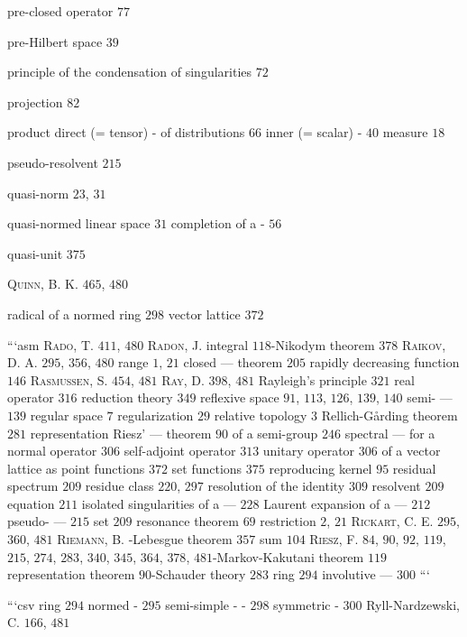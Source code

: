 pre-closed operator $77$

pre-Hilbert space $39$

principle of the condensation of singularities $72$

projection $82$

product direct (= tensor) - of distributions $66$ inner (= scalar) - $40$ measure $18$

pseudo-resolvent $215$

quasi-norm $23$, $31$

quasi-normed linear space $31$ completion of a - $56$

quasi-unit $375$

\textsc{Quinn}, B. K. $465$, $480$

radical of a normed ring $298$ vector lattice $372$ 

```asm \textsc{Rado}, T. $411$, $480$ \textsc{Radon}, J. integral $118$-Nikodym theorem $378$ \textsc{Raikov}, D. A. $295$, $356$, $480$ range $1$, $21$ closed --- theorem $205$ rapidly decreasing function $146$ \textsc{Rasmussen}, S. $454$, $481$ \textsc{Ray}, D. $398$, $481$ Rayleigh's principle $321$ real operator $316$ reduction theory $349$ reflexive space $91$, $113$, $126$, $139$, $140$ semi- --- $139$ regular space $7$ regularization $29$ relative topology $3$ Rellich-Gårding theorem $281$ representation Riesz' --- theorem $90$ of a semi-group $246$ spectral --- for a normal operator $306$ self-adjoint operator $313$ unitary operator $306$ of a vector lattice as point functions $372$ set functions $375$ reproducing kernel $95$ residual spectrum $209$ residue class $220$, $297$ resolution of the identity $309$ resolvent $209$ equation $211$ isolated singularities of a --- $228$ Laurent expansion of a --- $212$ pseudo- --- $215$ set $209$ resonance theorem $69$ restriction $2$, $21$ \textsc{Rickart}, C. E. $295$, $360$, $481$ \textsc{Riemann}, B. -Lebesgue theorem $357$ sum $104$ \textsc{Riesz}, F. $84$, $90$, $92$, $119$, $215$, $274$, $283$, $340$, $345$, $364$, $378$, $481$-Markov-Kakutani theorem $119$ representation theorem $90$-Schauder theory $283$ ring $294$ involutive --- $300$ ```

```csv ring $294$ normed - $295$ semi-simple - - $298$ symmetric - $300$ Ryll-Nardzewski, C. $166$, $481$

